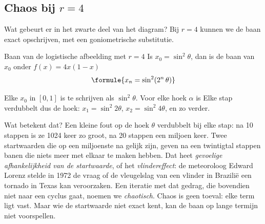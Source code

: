 
\begin{oefeningen}
\end{oefeningen}

\subsection{Chaos bij \texorpdfstring{$r = 4$}{r = 4}}

Wat gebeurt er in het zwarte deel van het diagram? Bij $r = 4$ kunnen we de baan exact opschrijven, met een goniometrische substitutie.

\begin{theorie}
\begin{stelling}{Baan van de logistische afbeelding met $r = 4$}
Is $x_0 = \sin^2\theta$, dan is de baan van $x_0$ onder $f(x) = 4x(1 - x)$
\[
\formule{x_n = \sin^2(2^n\,\theta)}
\]
\end{stelling}

\begin{bewijs}
Elke $x_0$ in $[0, 1]$ is te schrijven als $\sin^2\theta$. Voor elke hoek $\alpha$ is
Elke stap verdubbelt dus de hoek: $x_1 = \sin^2 2\theta$, $x_2 = \sin^2 4\theta$, en zo verder.
\end{bewijs}
\end{theorie}

Wat betekent dat? Een kleine fout op de hoek $\theta$ verdubbelt bij elke stap: na 10 stappen is ze 1024 keer zo groot, na 20 stappen een miljoen keer. Twee startwaarden die op een miljoenste na gelijk zijn, geven na een twintigtal stappen banen die niets meer met elkaar te maken hebben. Dat heet \emph{gevoelige afhankelijkheid van de startwaarde}, of het \textit{vlindereffect}: de meteoroloog Edward Lorenz stelde in 1972 de vraag of de vleugelslag van een vlinder in Brazilië een tornado in Texas kan veroorzaken. Een iteratie met dat gedrag, die bovendien niet naar een cyclus gaat, noemen we \emph{chaotisch}. Chaos is geen toeval: elke term ligt vast. Maar wie de startwaarde niet exact kent, kan de baan op lange termijn niet voorspellen.

